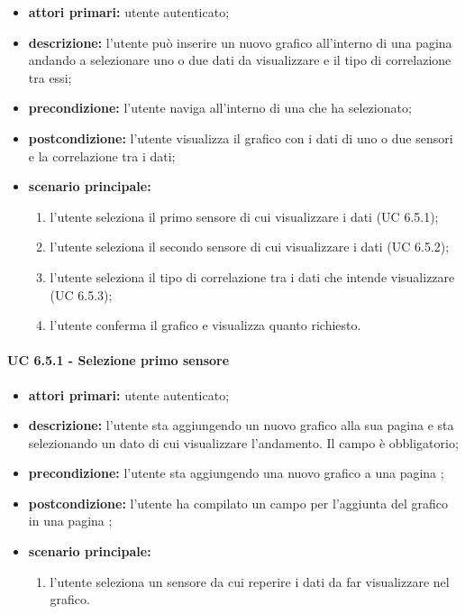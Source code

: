 			\begin{itemize}
				\item \textbf{attori primari:} utente autenticato;
				\item \textbf{descrizione:} l'utente può inserire un nuovo grafico all'interno di una pagina  andando a selezionare uno o due dati da visualizzare e il tipo di correlazione tra essi;
				\item \textbf{precondizione:} l'utente naviga all'interno di una  che ha selezionato;
				\item \textbf{postcondizione:} l'utente visualizza il grafico con i dati di uno o due sensori e la correlazione tra i dati;
				\item \textbf{scenario principale:}
				\begin{enumerate}
					\item{l'utente seleziona il primo sensore di cui visualizzare i dati (UC 6.5.1);}
					\item{l'utente seleziona il secondo sensore di cui visualizzare i dati (UC 6.5.2);}
					\item{l'utente seleziona il tipo di correlazione tra i dati che intende visualizzare (UC 6.5.3);}
					\item{l'utente conferma il grafico e visualizza quanto richiesto.}
				\end{enumerate}
			\end{itemize}

			\paragraph{UC 6.5.1 - Selezione primo sensore}
			\begin{itemize}
				\item \textbf{attori primari:} utente autenticato;
				\item \textbf{descrizione:} l'utente sta aggiungendo un nuovo grafico alla sua pagina  e sta selezionando un dato di cui visualizzare l'andamento. Il campo è obbligatorio;
				\item \textbf{precondizione:} l'utente sta aggiungendo una nuovo grafico a una pagina ;
				\item \textbf{postcondizione:} l'utente ha compilato un campo per l'aggiunta del grafico in una pagina ;
				\item \textbf{scenario principale:}
				\begin{enumerate}
					\item{l'utente seleziona un sensore da cui reperire i dati da far visualizzare nel grafico.}
				\end{enumerate}
			\end{itemize}

